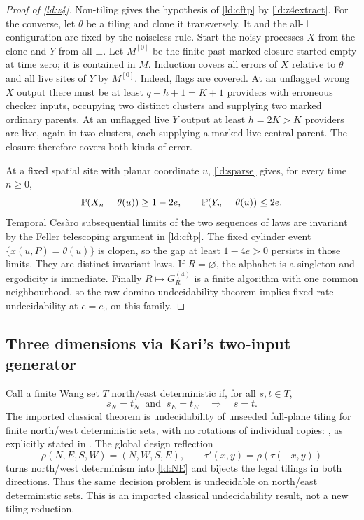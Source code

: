 \begin{proof}[Proof of \cref{ld:z4}]
Non-tiling gives the hypothesis of \cref{ld:cftp} by \cref{ld:z4extract}. For the converse, let $\theta$ be a tiling and clone it transversely. It and the all-$\bot$ configuration are fixed by the noiseless rule. Start the noisy processes $X$ from the clone and $Y$ from all $\bot$. Let $M^{[0]}$ be the finite-past marked closure started empty at time zero; it is contained in $M$. Induction covers all errors of $X$ relative to $\theta$ and all live sites of $Y$ by $M^{[0]}$. Indeed, flags are covered. At an unflagged wrong $X$ output there must be at least $q-h+1=K+1$ providers with erroneous checker inputs, occupying two distinct clusters and supplying two marked ordinary parents. At an unflagged live $Y$ output at least $h=2K>K$ providers are live, again in two clusters, each supplying a marked live central parent. The closure therefore covers both kinds of error.

At a fixed spatial site with planar coordinate $u$, \cref{ld:sparse} gives, for every time $n\ge0$,
\[
 \mathbb{P}(X_n=\theta(u))\ge1-2e,\qquad
 \mathbb{P}(Y_n=\theta(u))\le2e.
\]
Temporal Ces\`aro subsequential limits of the two sequences of laws are invariant by the Feller telescoping argument in \cref{ld:cftp}. The fixed cylinder event $\{x(u,P)=\theta(u)\}$ is clopen, so the gap at least $1-4e>0$ persists in those limits. They are distinct invariant laws. If $R=\varnothing$, the alphabet is a singleton and ergodicity is immediate. Finally $R\mapsto G_R^{(4)}$ is a finite algorithm with one common neighbourhood, so the raw domino undecidability theorem \cite{Berger66,Robinson71} implies fixed-rate undecidability at $e=e_0$ on this family.
\end{proof}

\subsection{Three dimensions via Kari's two-input generator}

Call a finite Wang set $T$ north/east deterministic if, for all $s,t\in T$,
\begin{equation}\label{ld:NE}
 s_N=t_N\ \text{ and }\ s_E=t_E\quad\Longrightarrow\quad s=t.
\end{equation}
The imported classical theorem is undecidability of unseeded full-plane tiling for finite north/west deterministic sets, with no rotations of individual copies: \cite{Kari92}, as explicitly stated in \cite[Section~2.8, Theorem~5]{Kari05}. The global design reflection
\[
 \rho(N,E,S,W)=(N,W,S,E),\qquad
 \tau'(x,y)=\rho(\tau(-x,y))
\]
turns north/west determinism into \eqref{ld:NE} and bijects the legal tilings in both directions. Thus the same decision problem is undecidable on north/east deterministic sets. This is an imported classical undecidability result, not a new tiling reduction.

